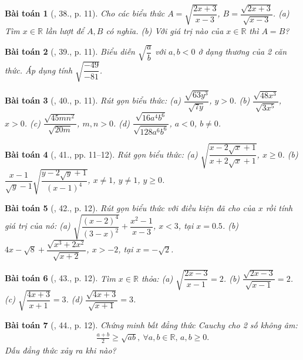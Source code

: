 \documentclass{article}
\newtheorem{baitoan}{Bài toán}
\begin{document}
\begin{baitoan}[\cite{SBT_Toan_9_tap_1}, 38., p. 11]
	Cho các biểu thức $A = \sqrt{\dfrac{2x + 3}{x - 3}}$, $B = \dfrac{\sqrt{2x + 3}}{\sqrt{x - 3}}$. (a) Tìm $x\in\mathbb{R}$ lần lượt để $A,B$ có nghĩa. (b) Với giá trị nào của $x\in\mathbb{R}$ thì $A = B$?
\end{baitoan}

\begin{baitoan}[\cite{SBT_Toan_9_tap_1}, 39., p. 11]
	Biểu diễn $\sqrt{\dfrac{a}{b}}$ với $a,b < 0$ ở dạng thương của 2 căn thức. Áp dụng tính $\sqrt{\dfrac{-49}{-81}}$.
\end{baitoan}

\begin{baitoan}[\cite{SBT_Toan_9_tap_1}, 40., p. 11]
	Rút gọn biểu thức: (a) $\dfrac{\sqrt{63y^3}}{\sqrt{7y}}$, $y > 0$. (b) $\dfrac{\sqrt{48x^3}}{\sqrt{3x^5}}$, $x > 0$. (c) $\dfrac{\sqrt{45mn^2}}{\sqrt{20m}}$, $m,n > 0$. (d) $\dfrac{\sqrt{16a^4b^6}}{\sqrt{128a^6b^6}}$, $a < 0$, $b\ne0$.
\end{baitoan}

\begin{baitoan}[\cite{SBT_Toan_9_tap_1}, 41., pp. 11--12]
	Rút gọn biểu thức: (a) $\sqrt{\dfrac{x - 2\sqrt{x} + 1}{x + 2\sqrt{x} + 1}}$, $x\ge0$. (b) $\dfrac{x - 1}{\sqrt{y} - 1}\sqrt{\dfrac{y - 2\sqrt{y} + 1}{(x - 1)^4}}$, $x\ne1$, $y\ne1$, $y\ge0$.
\end{baitoan}

\begin{baitoan}[\cite{SBT_Toan_9_tap_1}, 42., p. 12]
	Rút gọn biểu thức với điều kiện đã cho của $x$ rồi tính giá trị của nó: (a) $\sqrt{\dfrac{(x - 2)^4}{(3 - x)^2}} + \dfrac{x^2 - 1}{x - 3}$, $x < 3$, tại $x = 0.5$. (b) $4x - \sqrt{8} + \dfrac{\sqrt{x^3 + 2x^2}}{\sqrt{x + 2}}$, $x > -2$, tại $x = -\sqrt{2}$.
\end{baitoan}

\begin{baitoan}[\cite{SBT_Toan_9_tap_1}, 43., p. 12]
	Tìm $x\in\mathbb{R}$ thỏa: (a) $\sqrt{\dfrac{2x - 3}{x - 1}} = 2$. (b) $\dfrac{\sqrt{2x - 3}}{\sqrt{x - 1}} = 2$. (c) $\sqrt{\dfrac{4x + 3}{x + 1}} = 3$. (d) $\dfrac{\sqrt{4x + 3}}{\sqrt{x + 1}} = 3$.
\end{baitoan}

\begin{baitoan}[\cite{SBT_Toan_9_tap_1}, 44., p. 12]
	Chứng minh bất đẳng thức Cauchy cho 2 số không âm:
	\begin{align*}
		\frac{a + b}{2}\ge\sqrt{ab},\ \forall a,b\in\mathbb{R},\,a,b\ge0.
	\end{align*}
	Dấu đẳng thức xảy ra khi nào?
\end{baitoan}
\end{document}
